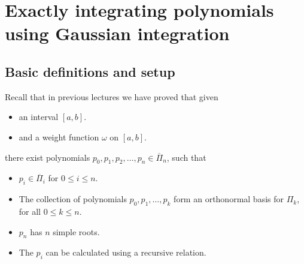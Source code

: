 
\section{Exactly integrating polynomials using Gaussian integration}

\subsection{Basic definitions and setup}

Recall that in previous lectures we have proved that given
\begin{itemize}
\item
  an interval $[a, b]$.
\item
  and a weight function $\omega$ on $[a, b]$.
\end{itemize}
there exist polynomials $p_0, p_1, p_2, \dots , p_n \in \overline{\Pi}_n$, such that
\begin{itemize}
\item
  $p_i \in \overline{\Pi}_i$ for $0 \leq i \leq n$.
\item
  The collection of polynomials $p_0, p_1, \dots , p_k$ form an orthonormal basis for $\Pi_k$, for all $0 \leq k \leq n$.
\item
  $p_n$ has $n$ simple roots.
\item
  The $p_i$ can be calculated using a recursive relation.
\end{itemize}

